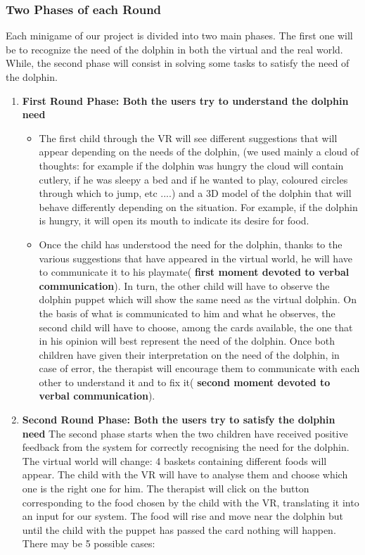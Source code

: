 \documentclass [12pt]{article}
\begin{document}
\subsubsection{Two Phases of each Round}
Each minigame of our project is divided into two main phases. 
The first one will be to recognize the need of the dolphin in both the virtual and the real world. While, the second phase  will consist in solving some tasks to satisfy the need of the dolphin.
\begin{enumerate}
\item  \textbf{First Round Phase: Both the users try to understand the dolphin need}
\begin{itemize}[•]
\item The first child through the VR will see different suggestions that will appear depending on the needs of the dolphin, (we used mainly a cloud of thoughts: for example if the dolphin was hungry the cloud will contain cutlery, if he was sleepy a bed and if he wanted to play, coloured circles through which to jump, etc ....) and a 3D model of the dolphin that will behave differently depending on the situation. For example, if the dolphin is hungry, it will open its mouth to indicate its desire for food.
\item Once the child has understood the need for the dolphin, thanks to the various suggestions that have appeared in the virtual world, he will have to communicate it to his playmate( \textbf{first moment devoted to verbal communication}). In turn, the other child will have to observe the dolphin puppet which will show the same need as the virtual dolphin. On the basis of what is communicated to him and what he observes, the second child will have to choose, among the cards available, the one that in his opinion will best represent the need of the dolphin. 
Once both children have given their interpretation on the need of the dolphin, in case of error, the therapist will encourage them to communicate with each other to understand it and to fix it( \textbf{second moment devoted to verbal communication}).
\end{itemize}
\item \textbf{Second Round Phase: Both the users try to satisfy the dolphin need}
The second phase starts when the two children have received positive feedback from the system for correctly recognising the need for the dolphin. The virtual world will change: 4 baskets containing different foods will appear. The child with the VR will have to analyse them and choose which one is the right one for him. The therapist will click on the button corresponding to the food chosen by the child with the VR, translating it into an input for our system. The food will rise and move near the dolphin but until the child with the puppet has passed the card nothing will happen. There may be 5 possible cases:

\end{enumerate}
\end{document}

